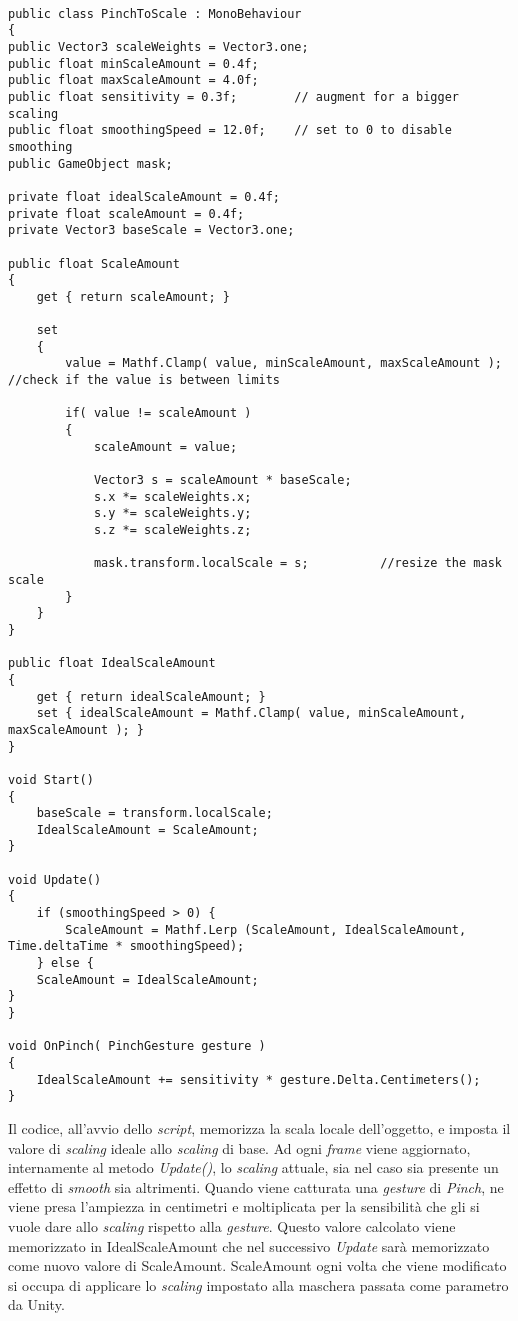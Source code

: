 \begin{lstlisting}

public class PinchToScale : MonoBehaviour
{
public Vector3 scaleWeights = Vector3.one;
public float minScaleAmount = 0.4f;
public float maxScaleAmount = 4.0f;
public float sensitivity = 0.3f;		// augment for a bigger scaling
public float smoothingSpeed = 12.0f;    // set to 0 to disable smoothing
public GameObject mask;

private float idealScaleAmount = 0.4f;
private float scaleAmount = 0.4f;
private Vector3 baseScale = Vector3.one;

public float ScaleAmount
{
	get { return scaleAmount; }
	
	set 
	{ 
		value = Mathf.Clamp( value, minScaleAmount, maxScaleAmount );	//check if the value is between limits
		
		if( value != scaleAmount )
		{
			scaleAmount = value;
			
			Vector3 s = scaleAmount * baseScale;
			s.x *= scaleWeights.x;
			s.y *= scaleWeights.y;
			s.z *= scaleWeights.z;
			
			mask.transform.localScale = s;			//resize the mask scale
		}
	}
}

public float IdealScaleAmount
{
	get { return idealScaleAmount; }
	set { idealScaleAmount = Mathf.Clamp( value, minScaleAmount, maxScaleAmount ); }
}

void Start()
{
	baseScale = transform.localScale;
	IdealScaleAmount = ScaleAmount;
}

void Update()
{
	if (smoothingSpeed > 0) {
		ScaleAmount = Mathf.Lerp (ScaleAmount, IdealScaleAmount, Time.deltaTime * smoothingSpeed);
	} else {
	ScaleAmount = IdealScaleAmount;
}
}

void OnPinch( PinchGesture gesture )
{  
	IdealScaleAmount += sensitivity * gesture.Delta.Centimeters();
} 
\end{lstlisting}

Il codice, all'avvio dello \textit{script}, memorizza la scala locale dell'oggetto, e imposta il valore di \textit{scaling} ideale allo \textit{scaling} di base. Ad ogni \textit{frame} viene aggiornato, internamente al metodo \textit{Update()}, lo \textit{scaling} attuale, sia nel caso sia presente un effetto di \textit{smooth} sia altrimenti. Quando viene catturata una \textit{gesture} di \textit{Pinch}, ne viene presa l'ampiezza in centimetri e moltiplicata per la sensibilit\`a che gli si vuole dare allo \textit{scaling} rispetto alla \textit{gesture}. Questo valore calcolato viene memorizzato in IdealScaleAmount che nel successivo \textit{Update} sar\`a memorizzato come nuovo valore di ScaleAmount. ScaleAmount ogni volta che viene modificato si occupa di applicare lo \textit{scaling} impostato alla maschera passata come parametro da Unity.\\\\


